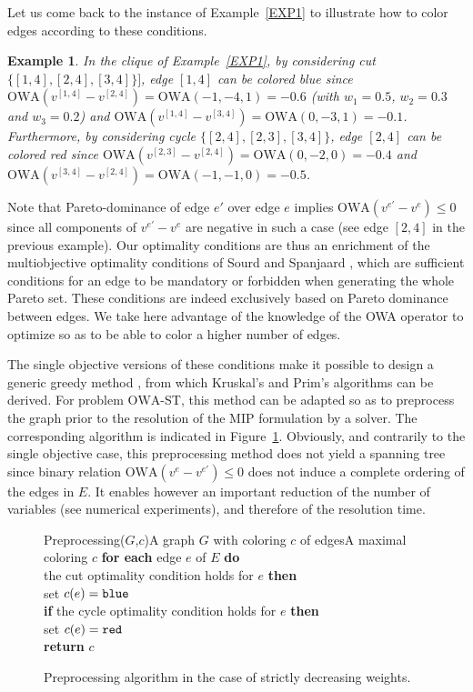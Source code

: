 \documentclass[final,3p,times]{elsarticle}
\newcommand{\owa}{\mbox{OWA}}
\newcommand{\blue}{\mbox{\tt blue}}
\newcommand{\red}{\mbox{\tt red}}
\newtheorem{example}{Example}
\def\keyw#1{{\bf#1}}
\def\tab{\hspace*{5mm}}
\begin{document}
Let us come back to the instance of Example~\ref{EXP1} to illustrate how to color edges according to these conditions.

\begin{example}
In the clique of Example~\ref{EXP1}, by considering cut $\{[1,4],[2,4],[3,4]\}]$, edge $[1,4]$ can be colored blue since $\owa(v^{[1,4]}-v^{[2,4]}) = \owa(-1,-4,1) = -0.6$ (with $w_1 = 0.5$, $w_2 = 0.3$ and $w_3 = 0.2$) and $\owa(v^{[1,4]}-v^{[3,4]}) = \owa(0,-3,1) = -0.1$. Furthermore, by considering cycle $\{[2,4],[2,3],[3,4]\}$, edge $[2,4]$ can be colored red since $\owa(v^{[2,3]}-v^{[2,4]}) = \owa(0,-2,0) = -0.4$ and $\owa(v^{[3,4]}-v^{[2,4]}) = \owa(-1,-1,0) = -0.5$. 
\end{example}

Note that Pareto-dominance of edge $e'$ over edge $e$ implies
$\owa(v^{e'}-v^{e}) \leq 0$ since all components of $v^{e'}-v^{e}$ are
negative in such a case (see edge $[2,4]$ in the previous
example). Our optimality conditions are thus an enrichment of the
multiobjective optimality conditions of Sourd and Spanjaard \cite{SourS08}, which are sufficient conditions for an edge to be mandatory or forbidden when generating the whole Pareto set. These conditions are indeed exclusively based on Pareto dominance between edges. We take here advantage of the knowledge of the OWA operator to optimize so as to be able to color a higher number of edges.

The single objective versions of these conditions make it possible to
design a generic greedy method \cite[e.g.][]{Tarja83}, from which
Kruskal's and Prim's algorithms can be derived. For problem $\owa$-ST, this method can be adapted so as to preprocess the graph prior to the resolution of the MIP formulation by a solver. The corresponding algorithm is indicated in Figure~\ref{onepass}. Obviously, and contrarily to the single objective case, this preprocessing method does not yield a spanning tree since binary relation $\owa(v^e-v^{e'}) \le 0$ does not induce a complete ordering of the edges in $E$. It enables however an important reduction of the number of variables (see numerical experiments), and therefore of the resolution time.

\begin{figure}
\begin{algo}{\sc Preprocessing($G$,$c$)}{A graph $G$ with coloring $c$ of edges}{A maximal coloring $c$}
\keyw{for each} edge $e$ of $E$ \keyw{do}\\
\tab \keyw{if} the cut optimality condition holds for $e$ \keyw{then}\\
\tab \tab set $c(e) = \blue$ \\
\tab \keyw{else} \keyw{if} the cycle optimality condition holds for $e$
\keyw{then}\\
\tab \tab set $c(e) = \red$ \\
\keyw{return} $c$
\end{algo}
\caption{\label{onepass} Preprocessing algorithm in the case of strictly decreasing weights.}
\end{figure}
\end{document}
